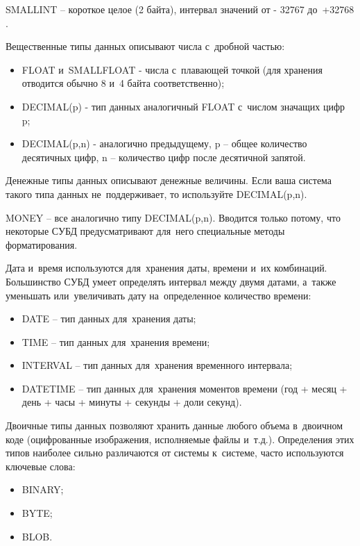 \documentclass{ou}
\begin{document}
SMALLINT -- короткое целое (2 байта), интервал значений от - 32767 до~+32768 .
 
Вещественные типы данных описывают числа с~дробной частью:

\begin{itemize}[label=-, leftmargin=0em, itemindent=3.35em, nosep]
\item FLOAT и~SMALLFLOAT - числа с~плавающей точкой (для хранения отводится обычно 8 и~4 байта соответственно);
\item DECIMAL(p) - тип данных аналогичный FLOAT с~числом значащих цифр p;
\item DECIMAL(p,n) - аналогично предыдущему, p -- общее количество десятичных цифр, n -- количество цифр после десятичной запятой.
\end{itemize}

Денежные типы данных описывают денежные величины. Если ваша система такого типа данных не~поддерживает, то используйте DECIMAL(p,n).

MONEY -- все аналогично типу DECIMAL(p,n). Вводится только потому, что некоторые СУБД предусматривают для~него специальные методы форматирования.

Дата и~время используются для~хранения даты, времени и~их комбинаций. Большинство СУБД умеет определять интервал между двумя датами, а~также уменьшать или~увеличивать дату на~определенное количество времени:

\begin{itemize}[label=-, leftmargin=0em, itemindent=3.35em, nosep]
\item DATE -- тип данных для~хранения даты;
\item TIME -- тип данных для~хранения времени;
\item INTERVAL -- тип данных для~хранения временного интервала;
\item DATETIME -- тип данных для~хранения моментов времени (год + месяц + день + часы + минуты + секунды + доли секунд).
\end{itemize}

Двоичные типы данных позволяют хранить данные любого объема в~двоичном коде (оцифрованные изображения, исполняемые файлы и~т.д.). Определения этих типов наиболее сильно различаются от системы к~системе, часто используются ключевые слова:

\begin{itemize}[label=-, leftmargin=0em, itemindent=3.35em, nosep]
\item BINARY;
\item BYTE;
\item BLOB.
\end{itemize}
\end{document}
